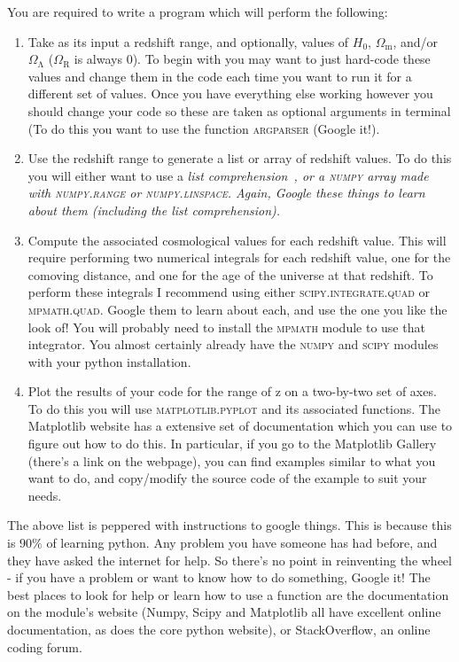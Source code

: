 \documentclass[]{article}
\begin{document}
You are required to write a program which will perform the following: 
\begin{enumerate}

\item Take as its input a redshift range, and optionally, values of $H_0$, $\Omega_\mathrm{m}$, and/or $\Omega_\mathrm{\Lambda}$ ($\Omega_\mathrm{R}$ is always $0$). To begin with you may want to just hard-code these values and change them in the code each time you want to run it for a different set of values. Once you have everything else working however you should change your code so these are taken as optional arguments in terminal (To do this you want to use the function \textsc{argparser} (Google it!). 
\item Use the redshift range to generate a list or array of redshift values. To do this you will either want to use a \itshape list comprehension~\upshape, or a \textsc{numpy} array made with \textsc{numpy.range} or \textsc{numpy.linspace}. Again, Google these things to learn about them (including the list comprehension). 
\item Compute the associated cosmological values for each redshift value. This will require performing two numerical integrals for each redshift value, one for the comoving distance, and one for the age of the universe at that redshift. To perform these integrals I recommend using either \textsc{scipy.integrate.quad} or \textsc{mpmath.quad}. Google them to learn about each, and use the one you like the look of! You will probably need to install the \textsc{mpmath} module to use that integrator. You almost certainly already have the \textsc{numpy} and \textsc{scipy} modules with your python installation. 
\item Plot the results of your code for the range of z on a two-by-two set of axes. To do this you will use \textsc{matplotlib.pyplot} and its associated functions. The Matplotlib website has a extensive set of documentation which you can use to figure out how to do this. In particular, if you go to the Matplotlib Gallery (there's a link on the webpage), you can find examples similar to what you want to do, and copy/modify the source code of the example to suit your needs. \\
\end{enumerate}

\noindent The above list is peppered with instructions to google things. This is because this is $90\%$ of learning python. Any problem you have someone has had before, and they have asked the internet for help. So there's no point in reinventing the wheel - if you have a problem or want to know how to do something, Google it! The best places to look for help or learn how to use a function are the documentation on the module's website (Numpy, Scipy and Matplotlib all have excellent online documentation, as does the core python website), or StackOverflow, an online coding forum. \\
\end{document}
